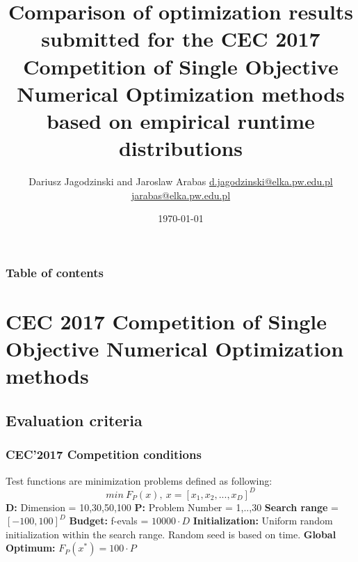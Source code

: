 \documentclass[hyperref={pdfpagelabels=false}]{beamer}
\title{Comparison of optimization results submitted for the 
CEC 2017 Competition of Single Objective Numerical Optimization methods
based on empirical runtime distributions}
\author{Dariusz Jagodzinski and Jaroslaw Arabas \newline\url{d.jagodzinski@elka.pw.edu.pl}\newline
\url{jarabas@elka.pw.edu.pl}}
\date{\today}
\begin{document}
\begin{frame}
\titlepage
\end{frame} 


\begin{frame}
\frametitle{Table of contents}
\tableofcontents
\end{frame} 


\section{
CEC 2017 Competition of Single Objective Numerical Optimization methods
} 
\subsection{Evaluation criteria}
\begin{frame}
\frametitle{CEC'2017 Competition conditions} 
Test functions are minimization problems defined as following:
\begin{equation*}
  min\ F_P(x),\ x=[x_1,x_2,...,x_D]^D
\end{equation*}
\textbf{D:} Dimension = {10,30,50,100}
\textbf{P:} Problem Number = {1,..,30}
\textbf{Search range} = $[-100,100]^D$
\textbf{Budget:} f-evals = $10000\cdot D$
\textbf{Initialization:} Uniform random initialization within the search range. Random seed is based on time.
\newline \textbf{Global Optimum:} $F_P(x^*) =100\cdot P $

%
    
\end{frame}
\end{document}
